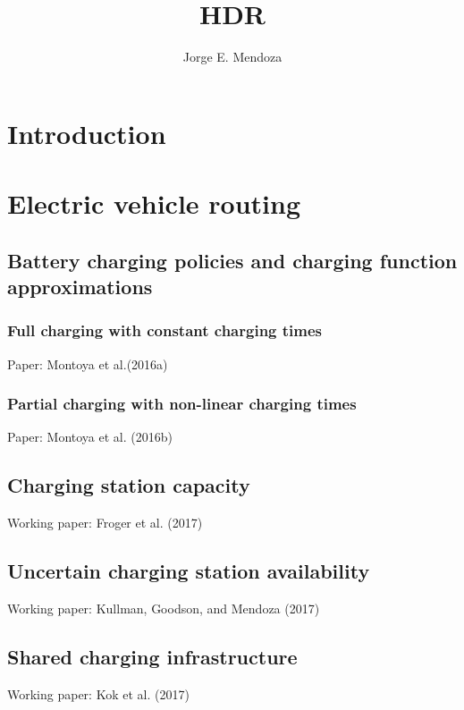 \documentclass[10pt,a4paper]{book}
\author{Jorge E. Mendoza}
\title{HDR}
\begin{document}
\maketitle

\tableofcontents


\chapter{Introduction}










\chapter{Electric vehicle routing}
  \section{Battery charging policies and charging function approximations}  
  	\subsection{Full charging with constant charging times}
  	Paper: Montoya et al.(2016a)
  	\subsection{Partial charging with non-linear charging times}
  	Paper: Montoya et al. (2016b)
  \section{Charging station capacity}
    Working paper: Froger et al. (2017)
  \section{Uncertain charging station availability}
  	Working paper: Kullman, Goodson, and Mendoza (2017)
  \section{Shared charging infrastructure}
  	Working paper: Kok et al. (2017)
\end{document}

